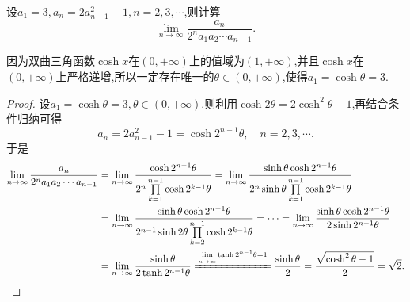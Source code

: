 \documentclass[../../main.tex]{subfiles}%
\begin{document}
\begin{example}\label{example:例3.82-利用双曲三角函数求递推数列}
设\(a_1 = 3,a_n=2a_{n - 1}^{2}-1,n = 2,3,\cdots\),则计算
\[
\lim_{n\rightarrow\infty}\frac{a_n}{2^n a_1a_2\cdots a_{n - 1}}.
\]
\end{example}
\begin{remark}
因为双曲三角函数\(\cosh x\)在\((0, +\infty)\)上的值域为\((1, +\infty)\),并且\(\cosh x\)在\((0, +\infty)\)上严格递增,所以一定存在唯一的\(\theta \in (0, +\infty)\),使得\(a_1 = \cosh\theta = 3\).
\end{remark}
\begin{proof}

设\(a_1 = \cosh\theta=3, \theta \in (0, +\infty)\).则利用\(\cosh 2\theta = 2\cosh^2\theta - 1\),再结合条件归纳可得
\[
a_n = 2a_{n - 1}^{2} - 1 = \cosh 2^{n - 1}\theta, \quad n = 2, 3, \cdots.
\]
于是
\begin{align*}
\lim_{n\rightarrow \infty} \frac{a_n}{2^na_1a_2\cdots a_{n - 1}}
&=\lim_{n\rightarrow \infty} \frac{\cosh 2^{n - 1}\theta}{2^n\prod\limits_{k = 1}^{n - 1}{\cosh 2^{k - 1}\theta}}
=\lim_{n\rightarrow \infty} \frac{\sinh\theta\cosh 2^{n - 1}\theta}{2^n\sinh\theta\prod\limits_{k = 1}^{n - 1}{\cosh 2^{k - 1}\theta}}\\
&=\lim_{n\rightarrow \infty} \frac{\sinh\theta\cosh 2^{n - 1}\theta}{2^{n - 1}\sinh 2\theta\prod\limits_{k = 2}^{n - 1}{\cosh 2^{k - 1}\theta}}
=\cdots
=\lim_{n\rightarrow \infty} \frac{\sinh\theta\cosh 2^{n - 1}\theta}{2\sinh 2^{n - 1}\theta}\\
&=\lim_{n\rightarrow \infty} \frac{\sinh\theta}{2\tanh 2^{n - 1}\theta}
\xlongequal{\lim\limits_{n\rightarrow \infty} \tanh 2^{n - 1}\theta = 1}\frac{\sinh\theta}{2}=\frac{\sqrt{\cosh ^2\theta -1}}{2}=\sqrt{2}.
\end{align*}

\end{proof}
\end{document}
